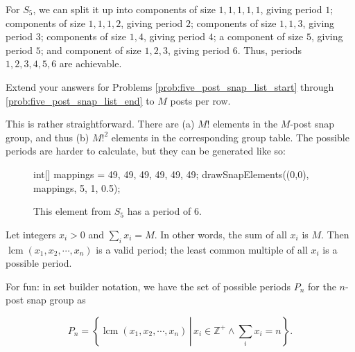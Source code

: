 \documentclass[../key.tex]{subfiles}
\begin{document}
\noindent For $S_5$, we can split it up into components of size $1,1,1,1,1$, giving period $1$; components of size $1,1,1,2$, giving period $2$; components of size $1,1,3$, giving period $3$; components of size $1,4$, giving period $4$; a component of size $5$, giving period $5$; and component of size $1,2,3$, giving period $6$. Thus, periods $1,2,3,4,5,6$ are achievable.

\begin{inner_problem}
\item Extend your answers for Problems \ref{prob:five_post_snap_list_start} through \ref{prob:five_post_snap_list_end} to $M$ posts per row.
\end{inner_problem}

\noindent This is rather straightforward. There are (a) $M!$ elements in the $M$-post snap group, and thus (b) $M!^2$ elements in the corresponding group table. The possible periods are harder to calculate, but they can be generated like so:

\begin{figure}[h]
	\begin{center}
		\begin{minipage}[b]{\textwidth}
			\centering
			\begin{asy}[width=0.2\textwidth]
				int[] mappings = {49, 49, 49, 49, 49, 49};
				drawSnapElements((0,0), mappings, 5, 1, 0.5);
			\end{asy}
		\end{minipage}
	\end{center}
	\vspace*{-2\baselineskip}
	\begin{center}
		\begin{minipage}[t]{\textwidth}
			\caption{This element from $S_5$ has a period of $6$.}
			\label{fig:period_6_elem}
		\end{minipage}
	\end{center}
	\vspace*{-2\baselineskip}
\end{figure}

\noindent Let integers $x_i>0$ and $\displaystyle \sum_i x_i = M$. In other words, the sum of all $x_i$ is $M$. Then $\operatorname{lcm} (x_1, x_2, \cdots, x_n)$ is a valid period; the least common multiple of all $x_i$ is a possible period.

For fun: in set builder notation, we have the set of possible periods $P_n$ for the $n$-post snap group as

$$P_n=\left\{\operatorname{lcm} (x_1, x_2, \cdots, x_n)\, \left|\,x_i\in\mathbb{Z}^+ \land \sum_i x_i=n\right.\right\}.$$
\end{document}
